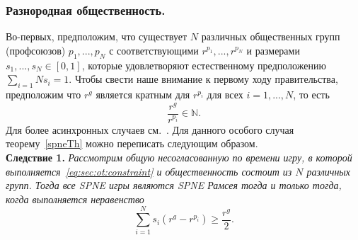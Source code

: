 \subsubsection{Разнородная общественность.} Во-первых, предположим, что существует $N$ различных общественных групп (профсоюзов) $p_1,...,p_N$ с соответствующими $r^{p_1},...,r^{p_N}$ и размерами $s_1,...,s_N \in [0,1]$, которые удовлетворяют естественному предположению $\sum_{i=1}{N}s_i = 1$. Чтобы свести наше внимание к первому ходу правительства, предположим что $r^g$ является кратным для $r^{p_i}$ для всех $i = 1,...,N$, то есть
$$ \frac{r^g}{r^{p_i}} \in \mathbb{N}.$$
Для более асинхронных случаев  см.~\cite{libichIncorpo}. Для данного особого случая теорему~\ref{spneTh} можно переписать следующим образом.\\
\textbf{Следствие 1.} \textit{Рассмотрим общую несогласованную по времени игру, в которой выполняется~\eqref{eq:sec:ot:constraint} и общественность состоит из $N$ различных групп. Тогда все SPNE игры являются SPNE Рамсея тогда и только тогда, когда выполняется неравенство
	\begin{equation}
	\label{sec:hetero:main4}
	\sum_{i=1}^N s_i(r^g - r^{p_i}) \geq \frac{r^g}{2} .
	\end{equation}
}

